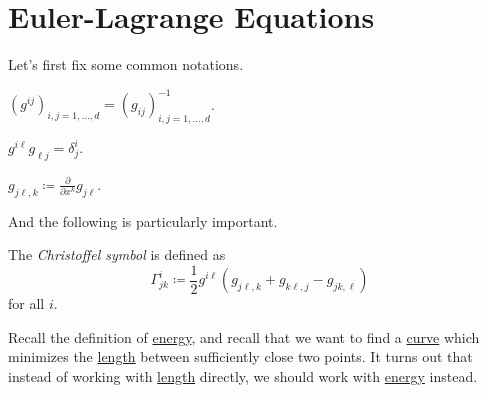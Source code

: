 \section{Euler-Lagrange Equations}
Let's first fix some common notations.

\begin{notation}
	\(\left( g^{ij} \right) _{i, j=1, \ldots , d} = \left( g_{ij} \right)_{i, j = 1, \ldots , d} ^{-1} \).
\end{notation}

\begin{note}
	\(g^{i \ell} g_{\ell j}=\delta ^i_j \).
\end{note}

\begin{notation}
	\(g_{j \ell , k} \coloneqq \frac{\partial }{\partial x^k} g_{j \ell }\).
\end{notation}

And the following is particularly important.

\begin{notation}
	The \emph{Christoffel symbol} is defined as
	\[
		\Gamma ^i_{jk} \coloneqq \frac{1}{2}g^{i \ell }\left( g_{j \ell , k} + g_{k \ell , j} - g_{jk, \ell }\right)
	\]
	for all \(i\).
\end{notation}

Recall the definition of \hyperref[def:energy]{energy}, and recall that we want to find a \hyperref[def:curve]{curve} which minimizes the \hyperref[def:length]{length} between sufficiently close two points. It turns out that instead of working with \hyperref[def:length]{length} directly, we should work with \hyperref[def:energy]{energy} instead.

